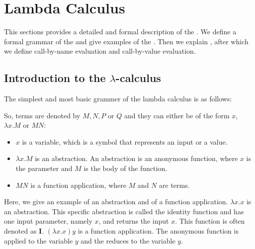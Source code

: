 \chapter{Lambda Calculus}
This sections provides a detailed and formal description of the \lc. We define a formal grammar of the \lc and give examples of the \lc.
Then we explain \br, after which we define call-by-name evaluation and call-by-value evaluation.


\section{\texorpdfstring{Introduction to the \boldmath$\lambda$-calculus}{Introduction to the Lambda Calculus}}
The simplest and most basic grammer of the lambda calculus is as follows:

\vspace{10pt}
\begin{grammar}{
	}
\end{grammar}

\vspace{10pt}
So, terms are denoted by $M, N, P$ or $Q$ and they can either be of the form $x$, $\lambda x.M$ or $M N$:
\begin{itemize}[noitemsep]
	\item $x$ is a variable, which is a symbol that represents an input or a value.
	\item $\lambda x.M$ is an abstraction. An abstraction is an anonymous function, where $x$ is the parameter and $M$ is the body of the function.
	\item $M N$ is a function application, where $M$ and $N$ are terms.
\end{itemize}

Here, we give an example of an abstraction and of a function application. $\lambda x. x$ is an abstraction. This specific abstraction is called the identity function and has one input parameter, namely $x$, and returns the input $x$.
This function is often denoted as $\mathbf{I}$. $(\lambda x. x) y$ is a function application. The anonymous function is applied to the variable $y$ and the \lterm reduces to the variable $y$.

